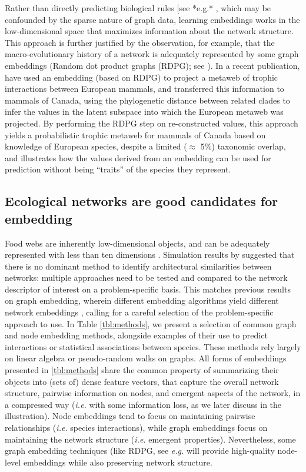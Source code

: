 Rather than directly predicting biological rules {[}see *e.g.*
\cite{Pichler2020Machine for an overview}, which may be confounded by the
sparse nature of graph data, learning embeddings works in the
low-dimensional space that maximizes information about the network
structure. This approach is further justified by the observation, for
example, that the macro-evolutionary history of a network is adequately
represented by some graph embeddings (Random dot product graphs
(RDPG); see \cite{DallaRiva2016Exploring}). In a recent publication,
\cite{Strydom2022Food} have used an embedding (based on RDPG) to project a
metaweb of trophic interactions between European mammals, and
transferred this information to mammals of Canada, using the
phylogenetic distance between related clades to infer the values in the
latent subspace into which the European metaweb was projected. By
performing the RDPG step on re-constructed values, this approach yields
a probabilistic trophic metaweb for mammals of Canada based on knowledge
of European species, despite a limited (\(\approx\) 5\%) taxonomic
overlap, and illustrates how the values derived from an embedding can be
used for prediction without being ``traits'' of the species they
represent.

\subsection{Ecological networks are good candidates for
embedding}\label{ecological-networks-are-good-candidates-for-embedding}

Food webs are inherently low-dimensional objects, and can be adequately
represented with less than ten dimensions \cite{Braga2021Phylogenetic,
Eklof2013Dimensionality, Braga2019Spatial}. Simulation results by
\cite{Botella2022Appraisal} suggested that there is no dominant method to
identify architectural similarities between networks: multiple
approaches need to be tested and compared to the network descriptor of
interest on a problem-specific basis. This matches previous results on
graph embedding, wherein different embedding algorithms yield different
network embeddings \cite{Goyal2018Graph}, calling for a careful
selection of the problem-specific approach to use. In Table \ref{tbl:methods}, we
present a selection of common graph and node embedding methods,
alongside examples of their use to predict interactions or statistical
associations between species. These methods rely largely on linear
algebra or pseudo-random walks on graphs. All forms of embeddings
presented in \ref{tbl:methods} share the common property of summarizing their
objects into (sets of) dense feature vectors, that capture the overall
network structure, pairwise information on nodes, and emergent aspects
of the network, in a compressed way (\emph{i.e.} with some information
loss, as we later discuss in the illustration). Node embeddings tend to
focus on maintaining pairwise relationships (\emph{i.e.} species
interactions), while graph embeddings focus on maintaining the network
structure (\emph{i.e.} emergent properties). Nevertheless, some graph
embedding techniques (like RDPG, see \emph{e.g.} \cite{Wu2021Maximum} will
provide high-quality node-level embeddings while also preserving network
structure.

